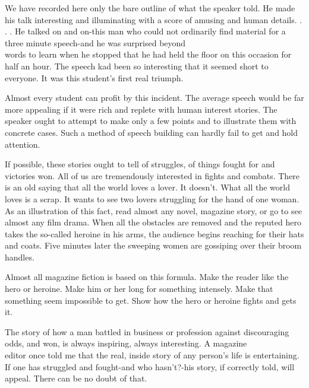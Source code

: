 \documentclass[10pt]{article}
\begin{document}
We have recorded here only the bare outline of what the speaker told. He made his talk interesting and illuminating with a score of amusing and human details. . . . He talked on and on-this man who could not ordinarily find material for a three minute speech-and he was surprised beyond\\
words to learn when he stopped that he had held the floor on this occasion for half an hour. The speech kad been so interesting that it seemed short to everyone. It was this student's first real triumph.

Almost every student can profit by this incident. The average speech would be far more appealing if it were rich and replete with human interest stories. The speaker ought to attempt to make only a few points and to illustrate them with concrete cases. Such a method of speech building can hardly fail to get and hold attention.

If possible, these stories ought to tell of struggles, of things fought for and victories won. All of us are tremendously interested in fights and combats. There is an old saying that all the world loves a lover. It doesn't. What all the world loves is a scrap. It wants to see two lovers struggling for the hand of one woman. As an illustration of this fact, read almost any novel, magazine story, or go to see almost any film drama. When all the obstacles are removed and the reputed hero takes the so-called heroine in his arms, the audience begins reaching for their hats and coats. Five minutes later the sweeping women are gossiping over their broom handles.

Almost all magazine fiction is based on this formula. Make the reader like the hero or heroine. Make him or her long for something intensely. Make that something seem impossible to get. Show how the hero or heroine fights and gets it.

The story of how a man battled in business or profession against discouraging odds, and won, is always inspiring, always interesting. A magazine\\
editor once told me that the real, inside story of any person's life is entertaining. If one has struggled and fought-and who hasn't?-his story, if correctly told, will appeal. There can be no doubt of that.
\end{document}

